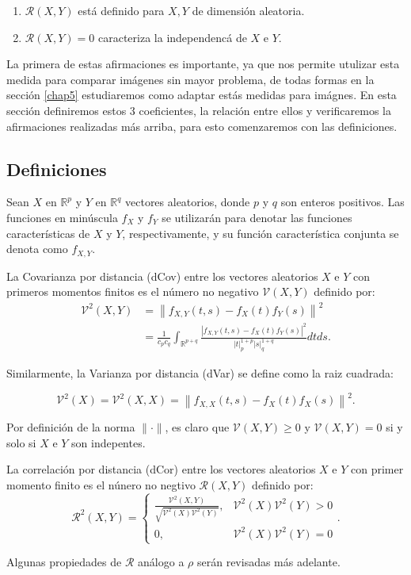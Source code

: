 \begin{enumerate}
	\item $\mathcal{R}(X,Y)$ est\'a definido para $X,Y$ de dimensi\'on aleatoria.
	\item $\mathcal{R}(X,Y) = 0$ caracteriza la independenc\'a de $X$ e $Y$.	 
\end{enumerate}

La primera de estas afirmaciones es importante, ya que nos permite utulizar esta medida para comparar im\'agenes sin mayor problema, de todas formas en la secci\'on \ref{chap5} estudiaremos como adaptar est\'as medidas para im\'agnes. En esta secci\'on definiremos estos 3 coeficientes, la relaci\'on entre ellos y verificaremos la afirmaciones realizadas m\'as arriba, para esto comenzaremos con las definiciones. 

\subsection{Definiciones}

Sean $X$ en $\mathbb{R}^p$ y $Y$ en $\mathbb{R}^q$ vectores aleatorios, donde $p$ y $q$ son enteros positivos. Las funciones en min\'uscula $f_X$ y $f_Y$ se utilizarán para denotar las funciones caracter\'isticas de $X$ y $Y$, respectivamente, y su funci\'on caracter\'istica conjunta se denota como $f_{X, Y}$. 

\begin{defn}
	La Covarianza por distancia (dCov) entre los vectores aleatorios $X$ e $Y$ con primeros momentos finitos es el n\'umero no negativo $\mathcal{V}(X, Y)$ definido por:
	$$
	\begin{aligned}
	\mathcal{V}^2(X, Y) & =\left\|f_{X, Y}(t, s)-f_X(t) f_Y(s)\right\|^2 \\
	& =\frac{1}{c_p c_q} \int_{\mathbb{R}^{p+q}} \frac{\left|f_{X, Y}(t, s)-f_X(t) f_Y(s)\right|^2}{|t|_p^{1+p}|s|_q^{1+q}} d t d s .
	\end{aligned}
	$$
	\end{defn}

	Similarmente, la Varianza por distancia (dVar) se define como la raiz cuadrada:

	$$
	\mathcal{V}^2(X)=\mathcal{V}^2(X, X)=\left\|f_{X, X}(t, s)-f_X(t) f_X(s)\right\|^2 .
	$$

	Por definici\'on de la norma $\|\cdot\|$, es claro que  $\mathcal{V}(X, Y) \geq 0$ y $\mathcal{V}(X, Y)=0$ si y solo si $X$ e $Y$ son indepentes.

	\begin{defn} 
		La correlaci\'on por distancia (dCor) entre los vectores aleatorios $X$ e $Y$ con primer momento finito es el n\'unero no negtivo $\mathcal{R}(X, Y)$ definido por:
		$$
		\mathcal{R}^2(X, Y)= \begin{cases}\frac{\mathcal{V}^2(X, Y)}{\sqrt{\mathcal{V}^2(X) \mathcal{V}^2(Y)}}, & \mathcal{V}^2(X) \mathcal{V}^2(Y)>0 \\ 0, & \mathcal{V}^2(X) \mathcal{V}^2(Y)=0\end{cases}.
		$$

	Algunas propiedades de $\mathcal{R}$ an\'alogo a $\rho$ ser\'an revisadas m\'as adelante. 
	\end{defn}

